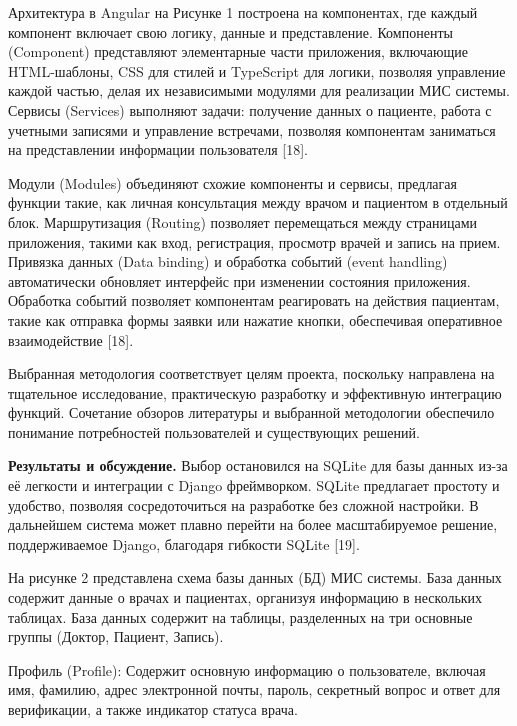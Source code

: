 \begin{multicols}{2}

Архитектура в Angular на Рисунке 1 построена на компонентах, где каждый
компонент включает свою логику, данные и представление. Компоненты
(Component) представляют элементарные части приложения, включающие
HTML-шаблоны, CSS для стилей и TypeScript для логики, позволяя
управление каждой частью, делая их независимыми модулями для реализации
МИС системы. Сервисы (Services) выполняют задачи: получение данных о
пациенте, работа с учетными записями и управление встречами, позволяя
компонентам заниматься на представлении информации пользователя
{[}18{]}.

Модули (Modules) объединяют схожие компоненты и сервисы, предлагая
функции такие, как личная консультация между врачом и пациентом в
отдельный блок. Маршрутизация (Routing) позволяет перемещаться между
страницами приложения, такими как вход, регистрация, просмотр врачей и
запись на прием. Привязка данных (Data binding) и обработка событий
(event handling) автоматически обновляет интерфейс при изменении
состояния приложения. Обработка событий позволяет компонентам
реагировать на действия пациентам, такие как отправка формы заявки или
нажатие кнопки, обеспечивая оперативное взаимодействие {[}18{]}.

Выбранная методология соответствует целям проекта, поскольку направлена
на тщательное исследование, практическую разработку и эффективную
интеграцию функций. Сочетание обзоров литературы и выбранной методологии
обеспечило понимание потребностей пользователей и существующих решений.

{\bfseries Результаты и обсуждение.} Выбор остановился на SQLite для базы
данных из-за её легкости и интеграции с Django фреймворком. SQLite
предлагает простоту и удобство, позволяя сосредоточиться на разработке
без сложной настройки. В дальнейшем система может плавно перейти на
более масштабируемое решение, поддерживаемое Django, благодаря гибкости
SQLite {[}19{]}.

На рисунке 2 представлена схема базы данных (БД) МИС системы. База
данных содержит данные о врачах и пациентах, организуя информацию в
нескольких таблицах. База данных содержит на таблицы, разделенных на три
основные группы (Доктор, Пациент, Запись).

Профиль (Profile): Содержит основную информацию о пользователе, включая
имя, фамилию, адрес электронной почты, пароль, секретный вопрос и ответ
для верификации, а также индикатор статуса врача.


\end{multicols}
